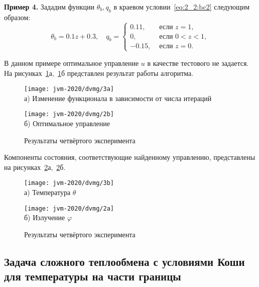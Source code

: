 \textbf{Пример 4.}
Зададим функции $\theta_{b}, q_{b}$ в краевом условии~\eqref{eq:2_2:bc2}
следующим образом:
\[
    \theta_{b}=0.1 z+0.3, \quad q_{b}=
    \begin{cases}
        0.11, & \text { если } z=1, \\
        0, & \text { если } 0<z<1, \\
        -0.15, & \text { если } z=0.
    \end{cases}
\]


В данном примере оптимальное управление $u$ в качестве тестового не задается.
На рисунках~\ref{fig:4_4:3}а,~\ref{fig:4_4:3}б представлен результат работы алгоритма.

\begin{figure}[h!t]
    \begin{minipage}[b][][b]{0.49\linewidth}
        \centering
        \texttt{[image: jvm-2020/dvmg/3a]}
        \\ а) Изменение функционала в зависимости от числа итераций
    \end{minipage}
    \hfill
    \begin{minipage}[b][][b]{0.49\linewidth}
        \centering
        \texttt{[image: jvm-2020/dvmg/2b]}
        \\ б) Оптимальное управление
    \end{minipage}
    \caption{Результаты четвёртого эксперимента}
    \label{fig:4_4:3}
\end{figure}

Компоненты состояния, соответствующие найденному управлению, представлены на
рисунках~\ref{fig:4_4:4}а,~\ref{fig:4_4:4}б.


\begin{figure}[h!t]
    \begin{minipage}[b][][b]{0.49\linewidth}
        \centering
        \texttt{[image: jvm-2020/dvmg/3b]}
        \\ а) Температура $\theta$
    \end{minipage}
    \hfill
    \begin{minipage}[b][][b]{0.49\linewidth}
        \centering
        \texttt{[image: jvm-2020/dvmg/2a]}
        \\ б) Излучение $\varphi$
    \end{minipage}
    \caption{Результаты четвёртого эксперимента}
    \label{fig:4_4:4}
\end{figure}

\subsection{
    Задача сложного теплообмена с условиями
    Коши для температуры на части границы
}\label{subsec:ch4/sec4/subsec2}

